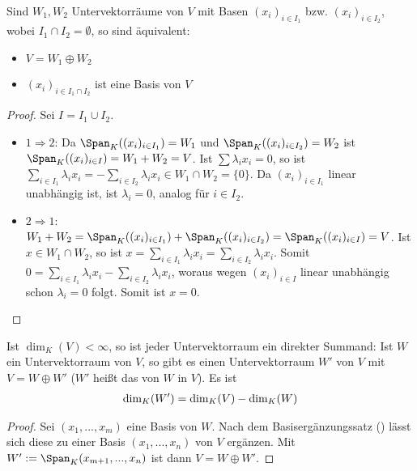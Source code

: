 \begin{proposition}
	Sind $W_1,W_2$ Untervektorräume von $V$ mit Basen $(x_i)_{i\in I_1}$ bzw. $(x_i)_{i\in I_2}$, wobei $I_1 \cap 
	I_2 = \emptyset$, so sind äquivalent:
	\begin{itemize}
		\item $V=W_1 \oplus W_2$
		\item $(x_i)_{i\in I_1 \cap I_2}$ ist eine Basis von $V$
	\end{itemize}
\end{proposition}
\begin{proof}
	Sei $I=I_1 \cup I_2$.
	\begin{itemize}
		\item $1\Rightarrow 2$: Da $\Span_K((x_i)_{i\in I_1})=W_1$ und $\Span_K((x_i)_{i\in I_2})=W_2$ ist $\Span_K((x_i)
		_{i\in I})=W_1+W_2=V$. Ist $\sum \lambda_ix_i=0$, so ist $\sum_{i\in I_1} \lambda_ix_i = -\sum
		_{i\in I_2} \lambda_ix_i \in W_1 \cap W_2 = \{0\}$. Da $(x_i)_{i\in I_1}$ linear unabhängig ist, ist 
		$\lambda_i=0$, analog für $i\in I_2$.
		\item $2\Rightarrow 1$: $W_1+W_2=\Span_K((x_i)_{i\in I_1})+\Span_K((x_i)_{i\in I_2})=\Span_K((x_i)_{i\in I})=V$. Ist 
		$x\in W_1 \cap W_2$, so ist $x=\sum_{i\in I_1} \lambda_ix_i = \sum_{i\in I_2} \lambda_ix_i$. Somit 
		$0=\sum_{i\in I_1} \lambda_ix_i - \sum_{i\in I_2} \lambda_ix_i$, woraus wegen $(x_i)_{i\in I}$ 
		linear unabhängig schon $\lambda_i=0$ folgt. Somit ist $x=0$.
	\end{itemize}
\end{proof}

\begin{conclusion}
	Ist $\dim_K(V)<\infty$, so ist jeder Untervektorraum ein direkter Summand: Ist $W$ ein Untervektorraum von $V$, so 
	gibt es einen Untervektorraum $W'$ von $V$ mit $V=W\oplus W'$ ($W'$ heißt das  von $W$ in $V$). Es 
	ist
	\begin{align}
		\dim_K(W')=\dim_K(V)-\dim_K(W)\notag
	\end{align}
\end{conclusion}
\begin{proof}
	Sei $(x_1,...,x_m)$ eine Basis von $W$. Nach dem Basisergänzungssatz () lässt sich diese zu einer Basis $(x_1,...,x_n)$ 
	von $V$ ergänzen. Mit $W':= \Span_K(x_{m+1},...,x_n)$ ist dann $V=W\oplus W'$.
\end{proof}

